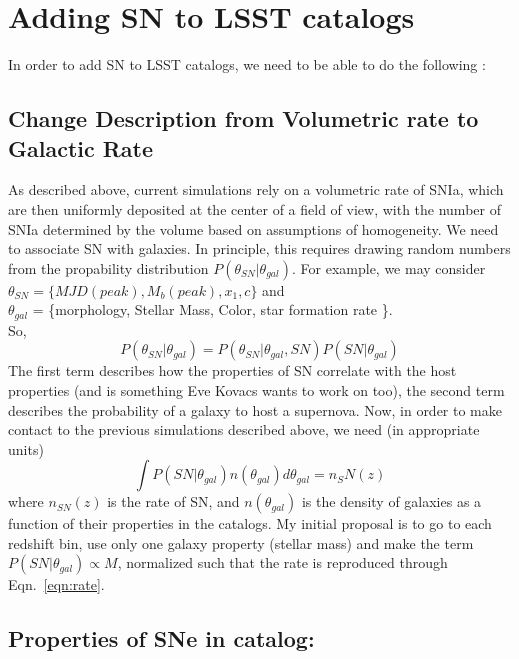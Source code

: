 \documentclass{article}[12pt]
\begin{document}
\section{Adding SN to LSST catalogs}
In order to add SN to LSST catalogs, we need to be able to do the following :
\subsection{Change Description from Volumetric rate to Galactic Rate}
As described above, current simulations rely on a volumetric rate of SNIa, 
which are then uniformly deposited at the center of a field of view, with the 
number of SNIa determined by the volume based on assumptions of homogeneity. 
We need to associate SN with galaxies. In 
principle, this requires drawing random numbers from the propability 
distribution $P( \theta_{SN} \vert \theta_{gal}).$
For example, we may consider $\theta_{SN} = \{MJD(peak), M_b(peak), x_1, c\}$ and \\
$\theta_{gal}$ = \{morphology, Stellar Mass, Color, star formation rate \}.\\
So,
$$
P(\theta_{SN} \vert \theta_{gal}) = P(\theta_{SN}\vert \theta_{gal}, SN) P(SN \vert \theta_{gal})$$
The first term describes how the properties of SN correlate with the host properties (and is something Eve Kovacs wants to work on too), the second term describes the probability of a galaxy to host a supernova. Now, in order to make contact to the previous simulations described above,
we need (in appropriate units) 
\begin{equation}
\int P(SN \vert \theta_{gal} ) n (\theta_{gal}) d \theta_{gal} = n_SN(z) 
\label{eqn:rate}
\end {equation}
where $n_{SN}(z) $ is the rate of SN, and $n(\theta_{gal})$ is the density of galaxies as a function of their properties in the catalogs. My initial proposal is to go to each redshift bin, use only one galaxy property (stellar mass) 
 and make the term $P(SN\vert \theta_{gal})\propto M$, normalized such that 
the rate is reproduced through Eqn.~\ref{eqn:rate}. 

\subsection{Properties of SNe in catalog:}
\end{document}
